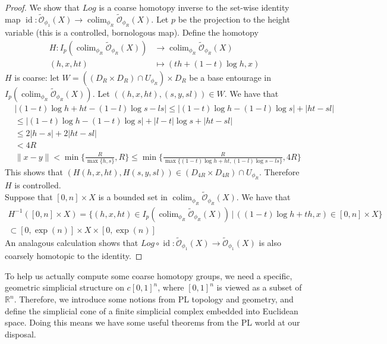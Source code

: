 \documentclass[a4paper,11pt]{article}
\theoremstyle{definition}
\theoremstyle{plain}
\theoremstyle{remark}
\DeclareMathOperator{\id}{id}
\DeclareMathOperator{\colim}{colim}
\begin{document}
\begin{proof}
We show that $Log$ is a coarse homotopy inverse to the set-wise identity map $\id: \tilde{\mathcal{O}}_{\phi_1}(X) \rightarrow \colim_{\phi_{R}}\tilde{\mathcal{O}}_{\phi_{R}}(X)$. Let $p$ be the projection to the height variable (this is a controlled, bornologous map). Define the homotopy
\begin{align*}
H: I_{p}(\colim_{\phi_{R}}\tilde{\mathcal{O}}_{\phi_{R}}(X))&\rightarrow \colim_{\phi_{R}}\tilde{\mathcal{O}}_{\phi_{R}}(X) \\
(h,x,ht) &\mapsto (th + (1-t)\log h, x)
\end{align*}
$H$ is coarse: let $W =((D_{R}\times D_{R}) \cap U_{\phi_{R}}) \times D_{R}$ be a base entourage in $ I_{p}(\colim_{\phi_{R}}\tilde{\mathcal{O}}_{\phi_{R}}(X))$. Let $((h,x,ht),(s,y,sl))\in W$. We have that
\begin{align*}
&|(1-t) \log h +ht - (1-l)\log s - ls| \leq |(1-t)\log h - (1-l) \log s| + |ht-sl|\\
&\leq |(1-t) \log h - (1-t) \log s| + |l-t| \log s  + |ht-sl|\\
&\leq 2|h-s| + 2|ht-sl| \\
&<4R\\
&\|x-y\| < \min\{\frac{R}{\max\{h,s\}},R\} \leq \min\{\frac{R}{\max\{(1-t) \log h +ht,(1-l)\log s - ls\}},4R\}
\end{align*}
This shows that $(H(h,x,ht), H(s,y,sl))\in (D_{4R} \times D_{4R})\cap U_{\phi_{R}}$. Therefore $H$ is controlled.\\

Suppose that $[0,n] \times X$ is a bounded set in $\colim_{\phi_{R}}\tilde{\mathcal{O}}_{\phi_{R}}(X)$. We have that 
\begin{align*}
H^{-1}([0,n] \times X) = \{(h,x,ht)\in  I_{p}(\colim_{\phi_{R}}\tilde{\mathcal{O}}_{\phi_{R}}(X))\,|\, ((1-t) \log h + th, x)\in [0,n] \times X\}\\
\subset [0,\exp(n)] \times X \times [0,\exp(n)]
\end{align*}
An analagous calculation shows that $Log \circ \id: \tilde{\mathcal{O}}_{\phi_1}(X)\rightarrow \tilde{\mathcal{O}}_{\phi_1}(X)$ is also coarsely homotopic to the identity. 
\end{proof}

To help us actually compute some coarse homotopy groups, we need a specific, geometric simplicial structure on $c[0,1]^n$, where $[0,1]^n$ is viewed as a subset of $\mathbb{R}^n$. Therefore, we introduce some notions from PL topology and geometry, and define the simplicial cone of a finite simplicial complex embedded into Euclidean space. Doing this means we have some useful theorems from the PL world at our disposal.  \\
\end{document}
